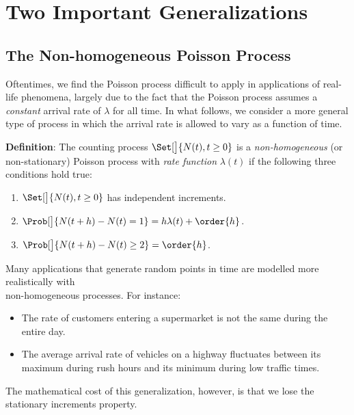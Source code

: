 \section{Two Important Generalizations}
\subsection*{The Non-homogeneous Poisson Process}
Oftentimes, we find the Poisson process difficult to apply in applications of real-life
phenomena, largely due to the fact that the Poisson process assumes a \emph{constant} arrival rate of
$ \lambda $ for all time. In what follows, we consider a more general type of process in which the arrival
rate is allowed to vary as a function of time.
\begin{Regular}
    \textbf{Definition}: The counting process $ \Set[\big]{N(t),t\ge 0} $ is a \emph{non-homogeneous} (or non-stationary)
    Poisson process with \emph{rate function} $ \lambda(t) $ if the following three conditions hold true:
    \begin{enumerate}[(1)]
        \item $ \Set[\big]{N(t),t\ge 0} $ has independent increments.
        \item $ \Prob[\big]{N(t+h)-N(t)=1}=h\lambda(t)+\order{h} $.
        \item $ \Prob[\big]{N(t+h)-N(t)\ge 2}=\order{h} $.
    \end{enumerate}
\end{Regular}
Many applications that generate random points in time are modelled more realistically with\\
non-homogeneous processes. For instance:
\begin{itemize}
    \item The rate of customers entering a supermarket is not the same during the entire day.
    \item The average arrival rate of vehicles on a highway fluctuates between its maximum during
          rush hours and its minimum during low traffic times.
\end{itemize}
The mathematical cost of this generalization, however, is that we lose the stationary
increments property.

